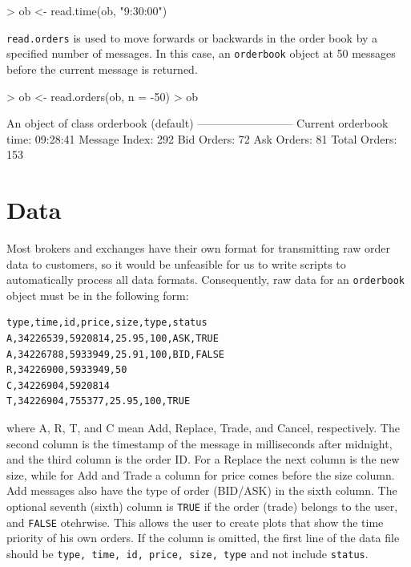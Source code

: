 \begin{Schunk}
\begin{Sinput}
> ob <- read.time(ob, "9:30:00")
\end{Sinput}
\end{Schunk}

\texttt{read.orders} is used to move forwards or backwards in the
order book by a specified number of messages. In this case, an
\texttt{orderbook} object at 50 messages before the current message is
returned.

\begin{Schunk}
\begin{Sinput}
> ob <- read.orders(ob, n = -50)
> ob
\end{Sinput}
\begin{Soutput}
An object of class orderbook (default)
--------------------------
Current orderbook time:    09:28:41
Message Index:             292
Bid Orders:                72
Ask Orders:                81
Total Orders:              153
\end{Soutput}
\end{Schunk}

\section{Data}

Most brokers and exchanges have their own format for transmitting raw
order data to customers, so it would be unfeasible for us to write
scripts to automatically process all data formats. Consequently, raw
data for an \texttt{orderbook} object must be in the following form:

\begin{verbatim}
type,time,id,price,size,type,status
A,34226539,5920814,25.95,100,ASK,TRUE
A,34226788,5933949,25.91,100,BID,FALSE
R,34226900,5933949,50
C,34226904,5920814
T,34226904,755377,25.95,100,TRUE
\end{verbatim}

\noindent where A, R, T, and C mean Add, Replace, Trade, and Cancel,
respectively. The second column is the timestamp of the message in
milliseconds after midnight, and the third column is the order ID. For
a Replace the next column is the new size, while for Add and Trade a
column for price comes before the size column. Add messages also have
the type of order (BID/ASK) in the sixth column. The optional seventh
(sixth) column is \texttt{TRUE} if the order (trade) belongs to the
user, and \texttt{FALSE} otehrwise. This allows the user to create
plots that show the time priority of his own orders. If the column is
omitted, the first line of the data file should be \texttt{type, time,
  id, price, size, type} and not include \texttt{status}.

